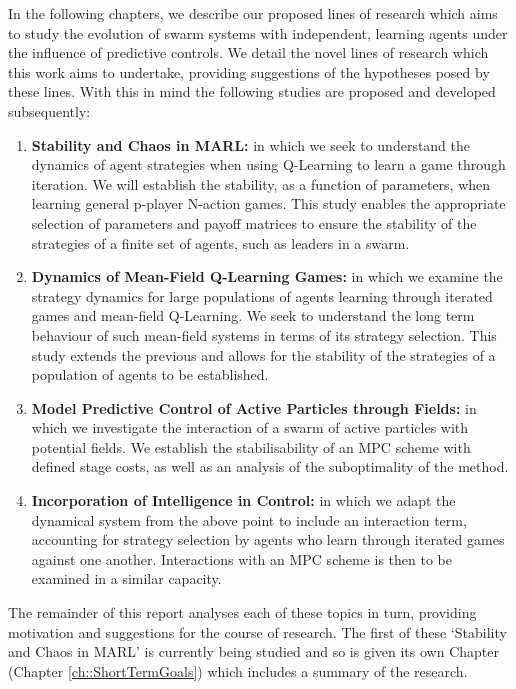 \documentclass[.../main.tex]{subfiles}
\begin{document}
	
	In the following chapters, we describe our proposed lines of research which aims
    to study the evolution of swarm systems with independent,
    learning agents under the influence of predictive controls. We
    detail the novel lines of research which this work aims to
    undertake, providing suggestions of the hypotheses posed by
    these lines. With this in mind the following studies are
    proposed and developed subsequently:

    \begin{enumerate}
		\item \textbf{Stability and Chaos in MARL:} in which we seek to understand the dynamics of agent
		strategies when using Q-Learning to learn a game through iteration. We will establish the
		stability, as a function of parameters, when learning general p-player N-action games.  This
		study enables the appropriate selection of parameters and payoff matrices to ensure the
		stability of the strategies of a finite set of agents, such as leaders in a swarm.
        \item \textbf{Dynamics of Mean-Field Q-Learning Games:} in which we examine the
		strategy dynamics for large populations of agents learning through iterated games and
		mean-field Q-Learning. We seek to understand the long term behaviour of such mean-field
		systems in terms of its strategy selection. This study extends the previous and allows for
		the stability of the strategies of a population of agents to be established.
		\item \textbf{Model Predictive Control of Active Particles through Fields:} in which we
		investigate the interaction of a swarm of active particles with potential fields. We
		establish the stabilisability of an MPC scheme with defined stage costs, as well as an
		analysis of the suboptimality of the method.
		\item \textbf{Incorporation of Intelligence in Control:} in which we adapt the dynamical
		system from the above point to include an interaction term, accounting for strategy
		selection by agents who learn through iterated games against one another. Interactions with
		an MPC scheme is then to be examined in a similar capacity. 	 
    \end{enumerate}

    The remainder of this report analyses each of these topics in turn, providing
    motivation and suggestions for the course of research. The first of these `Stability and
    Chaos in MARL' is currently being studied and so is given its own Chapter (Chapter 
    \ref{ch::ShortTermGoals}) which includes a summary of the research.
\end{document}
